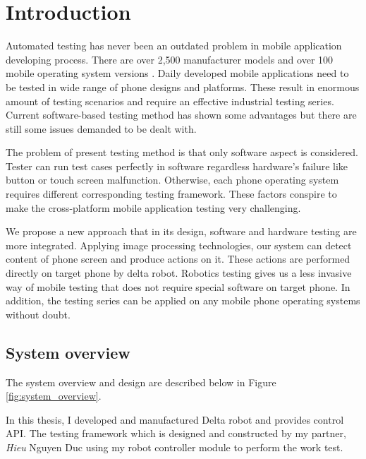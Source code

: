 \makeatletter
\def\maxwidth#1{\ifdim\Gin@nat@width>#1 #1\else\Gin@nat@width\fi}
\makeatother

\chapter{Introduction}

Automated testing has never been an outdated problem in mobile application developing process. There are over 2,500 manufacturer models and over 100 mobile operating system versions \cite{crittercism}. Daily developed mobile applications need to be tested in wide range of phone designs and platforms. These result in enormous amount of testing scenarios and require an effective industrial testing series. Current software-based testing method has shown some advantages but there are still some issues demanded to be dealt with.

The problem of present testing method is that only software aspect is considered. Tester can run test cases perfectly in software regardless hardware's failure like button or touch screen malfunction. Otherwise, each phone operating system requires different corresponding testing framework. These factors conspire to make the cross-platform mobile application testing very challenging. \nocite{weinman_thesis}

We propose a new approach that in its design, software and hardware testing are more integrated. Applying image processing technologies, our system can detect content of phone screen and produce actions on it. These actions are performed directly on target phone by delta robot. Robotics testing gives us a less invasive way of mobile testing that does not require special software on target phone. In addition, the testing series can be applied on any mobile phone operating systems without doubt.

\section{System overview}
The system overview and design are described below in Figure \ref{fig:system_overview}.

In this thesis, I developed and manufactured Delta robot and provides control API. The testing framework which is designed and constructed by my partner, \textit{Hieu} Nguyen Duc using my robot controller module to perform the work test.

